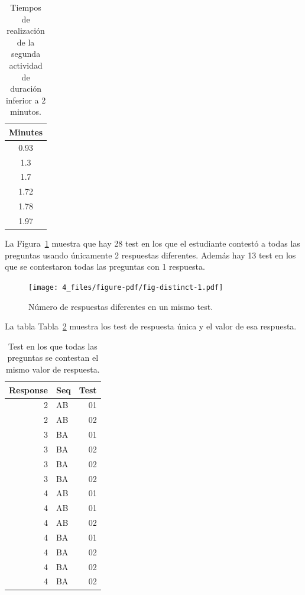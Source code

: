 \documentclass[
  12pt,
  a4paper,
  extrafontsizes,
  onecolumn,
  openright]{memoir}
\begin{document}
\hypertarget{tbl-washout}{}
\begin{longtable}{c}
\caption{\label{tbl-washout}Tiempos de realización de la segunda actividad de duración inferior a 2
minutos. }\tabularnewline

\toprule
Minutes \\ 
\midrule
0.93 \\ 
1.3 \\ 
1.7 \\ 
1.72 \\ 
1.78 \\ 
1.97 \\ 
\bottomrule
\end{longtable}

La Figura~\ref{fig-distinct} muestra que hay 28 test en los que el
estudiante contestó a todas las preguntas usando únicamente 2 respuestas
diferentes. Además hay 13 test en los que se contestaron todas las
preguntas con 1 respuesta.

\begin{figure}[h]

{\centering \texttt{[image: 4\_files/figure-pdf/fig-distinct-1.pdf]}

}

\caption{\label{fig-distinct}Número de respuestas diferentes en un mismo
test.}

\end{figure}

La tabla Tabla~\ref{tbl-distinct2} muestra los test de respuesta única y
el valor de esa respuesta.

\hypertarget{tbl-distinct2}{}
\begin{longtable}{rlr}
\caption{\label{tbl-distinct2}Test en los que todas las preguntas se contestan el mismo valor de
respuesta. }\tabularnewline

\toprule
Response & Seq & Test \\ 
\midrule
2 & AB & 01 \\ 
2 & AB & 02 \\ 
3 & BA & 01 \\ 
3 & BA & 02 \\ 
3 & BA & 02 \\ 
3 & BA & 02 \\ 
4 & AB & 01 \\ 
4 & AB & 01 \\ 
4 & AB & 02 \\ 
4 & BA & 01 \\ 
4 & BA & 02 \\ 
4 & BA & 02 \\ 
4 & BA & 02 \\ 
\bottomrule
\end{longtable}
\end{document}
